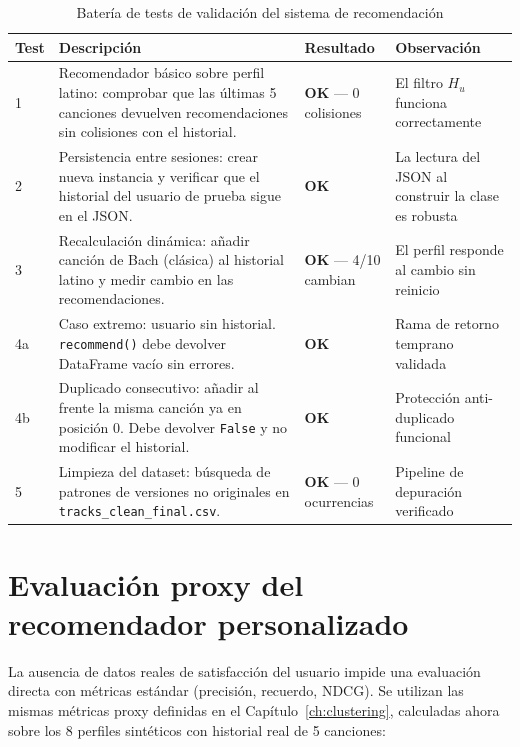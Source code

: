 \documentclass[12pt, a4paper]{book}
\theoremstyle{definition}
\begin{document}
\begin{table}[H]
\centering
\caption{Batería de tests de validación del sistema de recomendación}
\label{tab:tests}
\small
\begin{tabular}{p{1.0cm} p{5.5cm} p{2.5cm} p{3.5cm}}
\toprule
\textbf{Test} & \textbf{Descripción} & \textbf{Resultado} & \textbf{Observación} \\
\midrule
1 & Recomendador básico sobre perfil latino: comprobar que las últimas 5
    canciones devuelven recomendaciones sin colisiones con el historial.
  & \textbf{OK} — 0 colisiones & El filtro $H_u$ funciona correctamente \\
2 & Persistencia entre sesiones: crear nueva instancia y verificar que el
    historial del usuario de prueba sigue en el JSON.
  & \textbf{OK} & La lectura del JSON al construir la clase es robusta \\
3 & Recalculación dinámica: añadir canción de Bach (clásica) al historial
    latino y medir cambio en las recomendaciones.
  & \textbf{OK} — 4/10 cambian & El perfil responde al cambio sin reinicio \\
4a & Caso extremo: usuario sin historial. \texttt{recommend()} debe devolver
    DataFrame vacío sin errores.
  & \textbf{OK} & Rama de retorno temprano validada \\
4b & Duplicado consecutivo: añadir al frente la misma canción ya en posición 0.
    Debe devolver \texttt{False} y no modificar el historial.
  & \textbf{OK} & Protección anti-duplicado funcional \\
5 & Limpieza del dataset: búsqueda de patrones de versiones no originales en
    \texttt{tracks\_clean\_final.csv}.
  & \textbf{OK} — 0 ocurrencias & Pipeline de depuración verificado \\
\bottomrule
\end{tabular}
\end{table}

\section{Evaluación proxy del recomendador personalizado}
\label{sec:evaluacion_proxy}

La ausencia de datos reales de satisfacción del usuario impide una evaluación
directa con métricas estándar (precisión, recuerdo, NDCG). Se utilizan las
mismas métricas proxy definidas en el Capítulo~\ref{ch:clustering},
calculadas ahora sobre los 8 perfiles sintéticos con historial real de
5 canciones:
\end{document}
